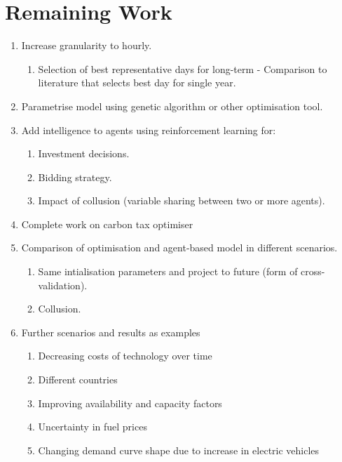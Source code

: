 \documentclass[12pt]{article}
\begin{document}
\section{Remaining Work}
\begin{enumerate}
  \item Increase granularity to hourly.
  \begin{enumerate}
  \item Selection of best representative days for long-term - Comparison to literature that selects best day for single year.
  \end{enumerate}
  \item  Parametrise model using genetic algorithm or other optimisation tool.

  \item Add intelligence to agents using reinforcement learning for:
  \begin{enumerate}
      \item Investment decisions.
      \item Bidding strategy.
      \item Impact of collusion (variable sharing between two or more agents).
  \end{enumerate}
  \item Complete work on carbon tax optimiser
  \item Comparison of optimisation and agent-based model in different scenarios.
  \begin{enumerate}
  \item Same intialisation parameters and project to future (form of cross-validation).
  \item Collusion.
  \end{enumerate}
  \item Further scenarios and results as examples
  \begin{enumerate}
  \item Decreasing costs of technology over time
  \item Different countries
  \item Improving availability and capacity factors
  \item Uncertainty in fuel prices
  \item Changing demand curve shape due to increase in electric vehicles
\end{enumerate}

\end{enumerate}




\clearpage
\end{document}
